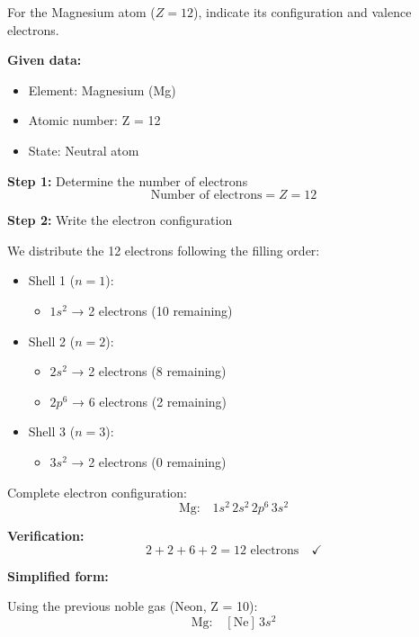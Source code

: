 \begin{exercise}
    For the Magnesium atom (\( Z = 12 \)), indicate its configuration and valence electrons.
    \begin{solu}
        \textbf{Given data:}
        \begin{itemize}
            \item Element: Magnesium (Mg)
            \item Atomic number: Z = 12
            \item State: Neutral atom
        \end{itemize}

        \textbf{Step 1:} Determine the number of electrons
        \[
            \text{Number of electrons} = Z = 12
        \]

        \textbf{Step 2:} Write the electron configuration

        We distribute the 12 electrons following the filling order:
        \begin{itemize}
            \item Shell 1 (\(n = 1\)):
            \begin{itemize}
                \item \(1s^2\) → 2 electrons (10 remaining)
            \end{itemize}
            \item Shell 2 (\(n = 2\)):
            \begin{itemize}
                \item \(2s^2\) → 2 electrons (8 remaining)
                \item \(2p^6\) → 6 electrons (2 remaining)
            \end{itemize}
            \item Shell 3 (\(n = 3\)):
            \begin{itemize}
                \item \(3s^2\) → 2 electrons (0 remaining)
            \end{itemize}
        \end{itemize}

        Complete electron configuration:
        \[
            \text{Mg:} \quad 1s^2 \, 2s^2 \, 2p^6 \, 3s^2
        \]

        \textbf{Verification:}
        \[
            2 + 2 + 6 + 2 = 12 \text{ electrons} \quad \checkmark
        \]

        \textbf{Simplified form:}

        Using the previous noble gas (Neon, Z = 10):
        \[
            \text{Mg:} \quad [\text{Ne}] \, 3s^2
        \]


\end{solu}
\end{exercise}
